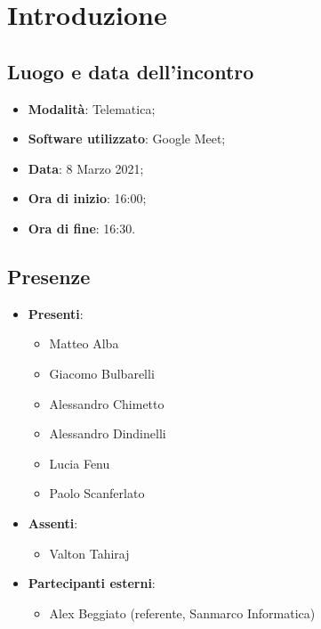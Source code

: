 \documentclass[]{article}
\begin{document}
	
	
	
	\newpage
	
	
	\section{Introduzione}
	\subsection{Luogo e data dell'incontro}
	\begin{itemize}
		\item \textbf{Modalità}: Telematica;
		\item \textbf{Software utilizzato}: Google Meet;
		\item \textbf{Data}: 8 Marzo 2021;
		\item \textbf{Ora di inizio}: 16:00;
		\item \textbf{Ora di fine}: 16:30.
	\end{itemize}
	
	\subsection{Presenze}
	\begin{itemize}
		\item \textbf{Presenti}: 
		\begin{itemize}
			\item Matteo Alba
			\item Giacomo Bulbarelli
			\item Alessandro Chimetto
			\item Alessandro Dindinelli
			\item Lucia Fenu
			\item Paolo Scanferlato
			
		\end{itemize}
		\item \textbf{Assenti}:
		\begin{itemize}
			\item Valton Tahiraj
			
		\end{itemize}
		\item \textbf{Partecipanti esterni}:
		\begin{itemize}
			\item Alex Beggiato (referente, Sanmarco Informatica)
		\end{itemize}	
	\end{itemize}
	
\end{document}
